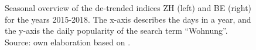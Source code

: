 \documentclass[11pt]{article}
\begin{document}
\begin{figure}[p!]
	\begin{minipage}{.5\linewidth}
		\centering
	\end{minipage}	\begin{minipage}{.5\linewidth}
		\centering
	\end{minipage}
	\caption{Seasonal overview of the de-trended indices ZH (left) and BE (right) for the years 2015-2018. The x-axis describes the days in a year, and the y-axis the daily popularity of the search term ``Wohnung''. Source: own elaboration based on \cite{googleT}.}
	\label{fig:season}
\end{figure}
\end{document}
